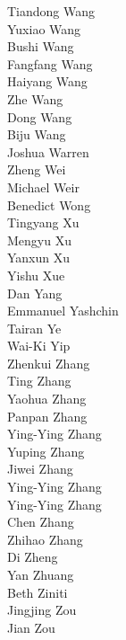 Tiandong Wang\\
Yuxiao Wang\\
Bushi Wang\\
Fangfang Wang\\
Haiyang Wang\\
Zhe Wang\\
Dong Wang\\
Biju Wang\\
Joshua Warren\\
Zheng Wei\\
Michael Weir\\
Benedict Wong\\
Tingyang Xu\\
Mengyu Xu\\
Yanxun Xu\\
Yishu Xue\\
Dan Yang\\
Emmanuel Yashchin\\
Tairan Ye\\
Wai-Ki Yip\\
Zhenkui Zhang\\
Ting Zhang\\
Yaohua  Zhang\\
Panpan Zhang\\
Ying-Ying Zhang\\
Yuping Zhang\\
Jiwei Zhang\\
Ying-Ying Zhang\\
Ying-Ying Zhang\\
Chen Zhang\\
Zhihao Zhang\\
Di Zheng\\
Yan Zhuang\\
Beth Ziniti\\
Jingjing Zou\\
Jian Zou\\
